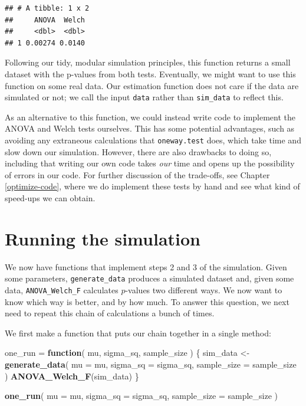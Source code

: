 \documentclass[
]{book}
\newenvironment{Shaded}{\begin{snugshade}}{\end{snugshade}}
\newcommand{\AttributeTok}[1]{\textcolor[rgb]{0.13,0.29,0.53}{#1}}
\newcommand{\ControlFlowTok}[1]{\textcolor[rgb]{0.13,0.29,0.53}{\textbf{#1}}}
\newcommand{\FunctionTok}[1]{\textcolor[rgb]{0.13,0.29,0.53}{\textbf{#1}}}
\newcommand{\NormalTok}[1]{#1}
\newcommand{\OtherTok}[1]{\textcolor[rgb]{0.56,0.35,0.01}{#1}}
\begin{document}
\begin{verbatim}
## # A tibble: 1 x 2
##     ANOVA  Welch
##     <dbl>  <dbl>
## 1 0.00274 0.0140
\end{verbatim}

Following our tidy, modular simulation principles, this function returns a small dataset with the p-values from both tests.
Eventually, we might want to use this function on some real data.
Our estimation function does not care if the data are simulated or not; we call the input \texttt{data} rather than \texttt{sim\_data} to reflect this.

As an alternative to this function, we could instead write code to implement the ANOVA and Welch tests ourselves.
This has some potential advantages, such as avoiding any extraneous calculations that \texttt{oneway.test} does, which take time and slow down our simulation.
However, there are also drawbacks to doing so, including that writing our own code takes \emph{our} time and opens up the possibility of errors in our code.
For further discussion of the trade-offs, see Chapter \ref{optimize-code}, where we do implement these tests by hand and see what kind of speed-ups we can obtain.

\section{Running the simulation}\label{running-the-simulation}

We now have functions that implement steps 2 and 3 of the simulation.
Given some parameters, \texttt{generate\_data} produces a simulated dataset and, given some data, \texttt{ANOVA\_Welch\_F} calculates \(p\)-values two different ways.
We now want to know which way is better, and by how much.
To answer this question, we next need to repeat this chain of calculations a bunch of times.

We first make a function that puts our chain together in a single method:

\begin{Shaded}
\begin{Highlighting}[]
\NormalTok{one\_run }\OtherTok{=} \ControlFlowTok{function}\NormalTok{( mu, sigma\_sq, sample\_size ) \{}
\NormalTok{  sim\_data }\OtherTok{\textless{}{-}} \FunctionTok{generate\_data}\NormalTok{(}
    \AttributeTok{mu =}\NormalTok{ mu, }
    \AttributeTok{sigma\_sq =}\NormalTok{ sigma\_sq,}
    \AttributeTok{sample\_size =}\NormalTok{ sample\_size}
\NormalTok{  )}
  \FunctionTok{ANOVA\_Welch\_F}\NormalTok{(sim\_data)}
\NormalTok{\}}

\FunctionTok{one\_run}\NormalTok{( }\AttributeTok{mu =}\NormalTok{ mu, }\AttributeTok{sigma\_sq =}\NormalTok{ sigma\_sq, }\AttributeTok{sample\_size =}\NormalTok{ sample\_size )}
\end{Highlighting}
\end{Shaded}
\end{document}
